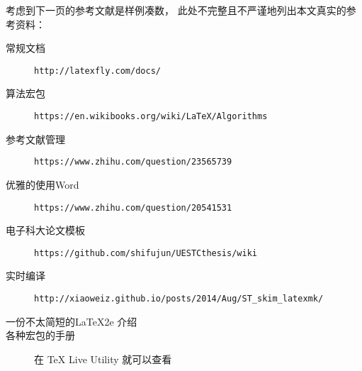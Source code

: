 考虑到下一页的参考文献是样例凑数，
此处不完整且不严谨地列出本文真实的参考资料：
\begin{description}
    \item[常规文档] \texttt{http://latexfly.com/docs/}
    \item[算法宏包] \texttt{https://en.wikibooks.org/wiki/LaTeX/Algorithms}
    \item[参考文献管理] \texttt{https://www.zhihu.com/question/23565739}
    \item[优雅的使用Word] \texttt{https://www.zhihu.com/question/20541531}
    \item[电子科大论文模板] \texttt{https://github.com/shifujun/UESTCthesis/wiki}
    \item[实时编译] \texttt{http://xiaoweiz.github.io/posts/2014/Aug/ST\_skim\_latexmk/}
    \item[一份不太简短的\LaTeX2e 介绍]   
    \item[各种宏包的手册] 在 TeX Live Utility 就可以查看
\end{description}
